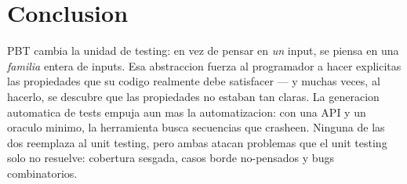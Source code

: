 \documentclass[12pt,a4paper]{article}
\begin{document}
\section*{Conclusion}

PBT cambia la unidad de testing: en vez de pensar en \emph{un} input, se piensa en una
\emph{familia} entera de inputs. Esa abstraccion fuerza al programador a hacer explicitas
las propiedades que su codigo realmente debe satisfacer --- y muchas veces, al hacerlo, se
descubre que las propiedades no estaban tan claras. La generacion automatica de tests
empuja aun mas la automatizacion: con una API y un oraculo minimo, la herramienta busca
secuencias que crasheen. Ninguna de las dos reemplaza al unit testing, pero ambas atacan
problemas que el unit testing solo no resuelve: cobertura sesgada, casos borde
no-pensados y bugs combinatorios.
\end{document}
